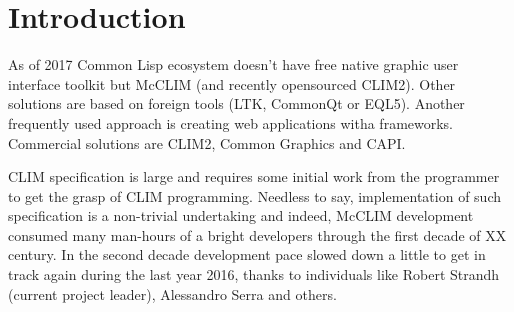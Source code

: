\section{Introduction}

As of 2017 Common Lisp ecosystem doesn't have free native graphic user
interface toolkit but McCLIM (and recently opensourced CLIM2). Other
solutions are based on foreign tools (LTK, CommonQt or EQL5). Another
frequently used approach is creating web applications witha
frameworks. Commercial solutions are CLIM2, Common Graphics and CAPI.

CLIM specification is large and requires some initial work from the
programmer to get the grasp of CLIM programming. Needless to say,
implementation of such specification is a non-trivial undertaking and
indeed, McCLIM development consumed many man-hours of a bright
developers through the first decade of XX century. In the second
decade development pace slowed down a little to get in track again
during the last year 2016, thanks to individuals like Robert Strandh
(current project leader), Alessandro Serra and others.
